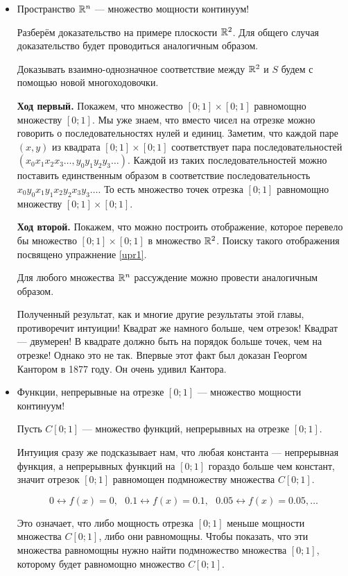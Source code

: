 \documentclass[12pt, a4paper]{article}
\begin{document}
\begin{itemize}
\item Пространство $\mathbb R^{n}$ --- множество мощности континуум!

Разберём доказательство на примере плоскости $\mathbb R^2$. Для общего случая доказательство будет проводиться аналогичным образом.

Доказывать взаимно-однозначное соответствие между $\mathbb R^2$ и $S$ будем с помощью новой многоходовочки.

\textbf{Ход первый.} Покажем, что множество $[0;1] \times [0;1]$ равномощно множеству $[0;1]$. Мы уже знаем, что вместо чисел на отрезке можно говорить о последовательностях нулей и единиц. Заметим, что каждой паре $(x,y)$ из квадрата $[0;1] \times [0;1]$ соответствует пара последовательностей $(x_0 x_1 x_2 x_3 \dots, y_0 y_1 y_2 y_3 \dots)$. Каждой из таких последовательностей можно поставить единственным образом в соответствие последовательность $x_0 y_0 x_1 y_1 x_2 y_2 x_3 y_3 \dots$. То есть множество точек отрезка  $[0;1]$ равномощно множеству $[0;1] \times [0;1]$.

\textbf{Ход второй.} Покажем, что можно построить отображение, которое перевело бы множество $[0;1] \times [0;1]$ в множество $\mathbb R^{2}$. Поиску такого отображения посвящено упражнение \ref{upr1}.

Для любого множества $\mathbb R^n$ рассуждение можно провести аналогичным образом.

Полученный результат, как и многие другие результаты этой главы, противоречит интуиции! Квадрат же намного больше, чем отрезок! Квадрат --- двумерен! В квадрате должно быть на порядок больше точек, чем на отрезке! Однако это не так. Впервые этот факт был доказан Георгом Кантором в 1877 году. Он очень удивил Кантора.

\item Функции, непрерывные на отрезке  $[0;1]$ --- множество мощности континуум!  \label{upr3}

Пусть $C[0;1]$ --- множество функций, непрерывных на отрезке $[0;1]$.

Интуиция сразу же подсказывает нам, что любая константа --- непрерывная функция, а непрерывных  функций на $[0;1]$ гораздо больше чем констант, значит отрезок $[0;1]$ равномощен подмножеству множества $C[0;1]$.

\[0 \leftrightarrow f(x) = 0, \mbox{ } 0.1 \leftrightarrow f(x) = 0.1, \mbox{ } 0.05 \leftrightarrow f(x) = 0.05, \dots \]

Это означает, что либо мощность отрезка $[0;1]$ меньше мощности множества $C[0;1]$, либо они равномощны.
Чтобы показать, что эти множества равномощны нужно найти подмножество множества $[0;1]$, которому будет равномощно множество $C[0;1]$.


\end{itemize}
\end{document}
